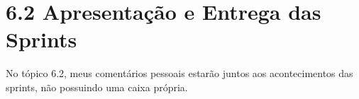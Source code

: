 \hypertarget{__RefHeading___Toc4804_379000079911}{}
\hypertarget{_Toc4562714411}{}

\section*{6.2 Apresentação e Entrega das Sprints}
\label{cliente-hoortech:text-h-0025}

No tópico 6.2, meus comentários pessoais estarão juntos aos acontecimentos das sprints, não possuindo uma caixa própria.\par

